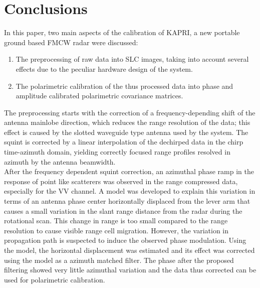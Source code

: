 \section{Conclusions}\label{sec:conclusions}
In this paper, two main aspects of the calibration of KAPRI, a new portable ground based FMCW radar were discussed:
\begin{enumerate}
	\item The preprocessing of raw data into SLC images, taking into account several effects due to the peculiar hardware design of the system.
	\item The polarimetric calibration of the thus processed data into phase and amplitude calibrated polarimetric covariance matrices.
\end{enumerate}
The preprocessing starts with the correction of a frequency-depending shift of the antenna mainlobe direction, which reduces the range resolution of the data; this effect is caused by the slotted waveguide type antenna used by the system. The squint is corrected by a linear interpolation of the dechirped data in the chirp time-azimuth domain, yielding correctly focused range profiles resolved in azimuth by the antenna beamwidth.\\
After the frequency dependent squint correction, an azimuthal phase ramp in the response of point like scatterers was observed in the range compressed data, especially for the VV channel. A model was developed to explain this variation in terms of an antenna phase center horizontally displaced from the lever arm that causes a small variation in the slant range distance from the radar during the rotational scan. This change in range is too small compared to the range resolution to cause visible range cell migration. However, the variation in propagation path is suspected to induce the observed phase modulation. Using the model, the horizontal displacement was estimated and its effect was corrected using the model as a azimuth matched filter. The phase after the proposed filtering showed very little azimuthal variation and the data thus corrected can be used for polarimetric calibration.\\

